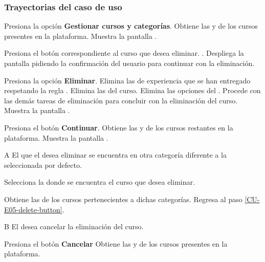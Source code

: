 \clearpage
\subsubsection{Trayectorias del caso de uso}

\begin{UCtrayectoria}%
%
  \Actor Presiona la opción {\bf Gestionar cursos y categorías}.
  \Sistema Obtiene las  y
            de los cursos presentes en la plataforma.
  \Sistema Muestra la pantalla . 

  \Actor Presiona el botón \IUEliminar correspondiente al curso que desea eliminar.
         \label{CU-E05-delete-button}. 
  \Sistema Despliega la pantalla  pidiendo la confirmación del
           usuario para continuar con la eliminación.

  \Actor Presiona la opción {\bf Eliminar}. 
  \Sistema Elimina las  de experiencia que se han
           entregado respetando la regla .
  \Sistema Elimina las  del curso.
  \Sistema Elimina las opciones del .
  \Sistema Procede con las demás tareas de eliminación para concluir con la
           eliminación del curso.
  \Sistema Muestra la pantalla .

  \Actor Presiona el botón {\bf Continuar}.
  \Sistema Obtiene las  y
            de los cursos restantes en la plataforma.
  \Sistema Muestra la pantalla .
\end{UCtrayectoria}

\begin{UCtrayectoriaA}{A}{%
El  que el  desea eliminar se encuentra
en otra categoría diferente a la seleccionada por defecto.}

  \Actor Selecciona la  donde se encuentra el curso
         que desea eliminar.

  \Sistema Obtiene las  de los cursos pertenecientes a
           dichas categorías.
  \Sistema Regresa al paso \ref{CU-E05-delete-button}.
\end{UCtrayectoriaA}

\begin{UCtrayectoriaA}{B}{%
El  desea cancelar la eliminación del curso.}

  \Actor Presiona el botón {\bf Cancelar}
  \Sistema Obtiene las  y
            de los cursos presentes en la plataforma.
\end{UCtrayectoriaA}
